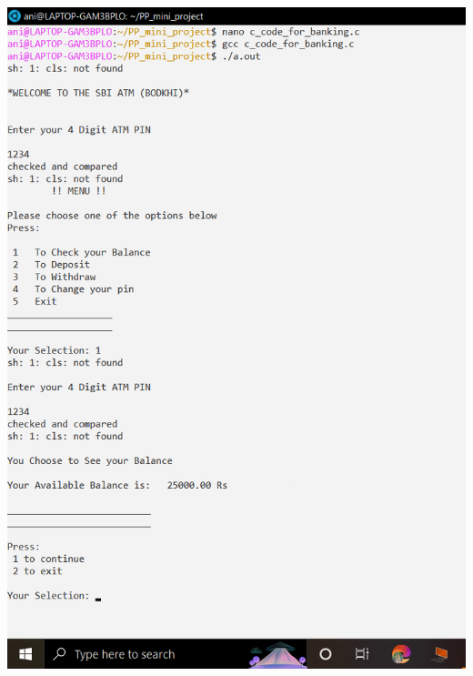 \documentclass{article}
\begin{document}
\includegraphics[scale=0.35]{output_c_1.png} \\ \\
\end{document}
